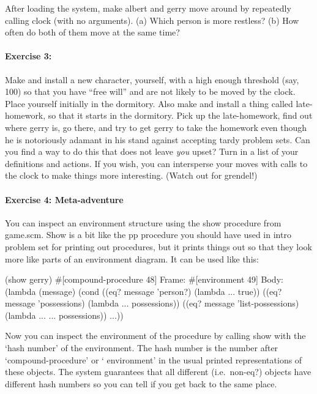 After loading the system, make {\cf albert} and {\cf gerry} move around by
repeatedly calling {\cf clock} (with no arguments).  (a) Which person is
more restless?  (b) How often do both of them move at the same time?

\paragraph{Exercise 3:}

Make and install a new character, yourself, with a high enough
threshold (say, 100) so that you have ``free will'' and are not likely
to be moved by the clock.  Place yourself initially in the {\cf
dormitory}.  Also make and install a thing called {\cf late-homework},
so that it starts in the {\cf dormitory}.  Pick up the {\cf
late-homework}, find out where {\cf gerry} is, go there, and try to
get {\cf gerry} to take the homework even though he is notoriously
adamant in his stand against accepting tardy problem sets.  Can you
find a way to do this that does not leave {\em you} upset?  Turn in a
list of your definitions and actions.  If you wish, you can
intersperse your moves with calls to the clock to make things more
interesting.  (Watch out for {\cf grendel}!)


\paragraph{Exercise 4: Meta-adventure}

You can inspect an environment structure using the {\cf show}
procedure from {\cf game.scm}.  {\cf Show} is a bit like the {\cf pp}
procedure you should have used in intro problem set for printing out
procedures, but it prints things out so that they look more like parts
of an environment diagram.  It can be used like this:

\beginlisp
(show gerry)
\#[compound-procedure 48]
Frame:
  \#[environment 49]
Body:
  (lambda (message)
    (cond ((eq? message 'person?) (lambda ... true))
          ((eq? message 'possessions) (lambda ... possessions))
          ((eq? message 'list-possessions) (lambda ... ... possessions))
          ...))
\null
\endlisp

\noindent Now you can inspect the environment of the procedure by
calling {\cf show} with the `hash number' of the environment.  The
hash number is the number after `{\cf compound-procedure}' or `{\cf
environment}' in the usual printed representations of these objects.
The system guarantees that all different (i.e.\ non-{\cf eq?}) objects
have different hash numbers so you can tell if you get back to the
same place.

